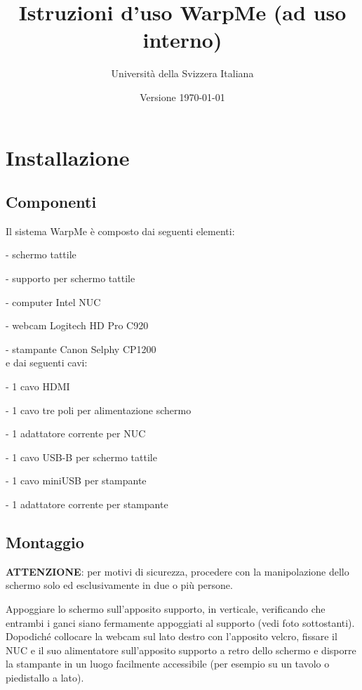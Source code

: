 \documentclass[12pt]{article}
\title{Istruzioni d'uso WarpMe (ad uso interno)}
\author{Università della Svizzera Italiana}
\date{Versione \today}
\begin{document}
\maketitle
\tableofcontents
\newpage


\section{Installazione}\label{installation}	

	\subsection{Componenti}
	
		Il sistema WarpMe è composto dai seguenti elementi:
		
		- schermo tattile
		
		- supporto per schermo tattile
		
		- computer Intel NUC
		
		- webcam Logitech HD Pro C920
		
		- stampante Canon Selphy CP1200\\
		
		e dai seguenti cavi:
		
		- 1 cavo HDMI
		
		- 1 cavo tre poli per alimentazione schermo
		
		- 1 adattatore corrente per NUC
		
		- 1 cavo USB-B per schermo tattile
		
		- 1 cavo miniUSB per stampante
		
		- 1 adattatore corrente per stampante
		
		
	\subsection{Montaggio}
	
		\textbf{ATTENZIONE}: per motivi di sicurezza, procedere con la manipolazione dello schermo solo ed esclusivamente in due o più persone.
		
		Appoggiare lo schermo sull'apposito supporto, in verticale, verificando che entrambi i ganci siano fermamente appoggiati al supporto (vedi foto sottostanti). Dopodiché collocare la webcam sul lato destro con l'apposito velcro, fissare il NUC e il suo alimentatore sull'apposito supporto a retro dello schermo e disporre la stampante in un luogo facilmente accessibile (per esempio su un tavolo o piedistallo a lato).
	
\end{document}
